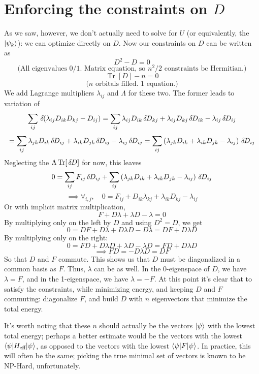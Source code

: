 \documentclass[a4paper,11pt]{article}
\DeclareMathOperator{\Tr}{Tr}
\newcommand{\9}{\,\,\,\,\,\,\,\,\,}
\newcommand{\ichg}{\,\delta\hspace{-0.3mm}}
\begin{document}
\section{Enforcing the constraints on $D$}
As we saw, however, we don't actually need to solve for $U$ (or equivalently, the $\ket{\psi_k}$): we can optimize directly on $D$. Now our constraints on $D$ can be written as
$$D^2 - D = 0$$
$$\textrm{(All eigenvalues 0/1. Matrix equation, so $n^2/2$ constraints bc Hermitian.)}$$
$$\Tr[D]- n = 0$$
$$\textrm{($n$ orbitals filled. 1 equation.)}$$
We add Lagrange multipliers $\lambda_{ij}$ and $\varLambda$ for these two. The former leads to variation of
$$\sum_{ij}\ichg(\lambda_{ij} D_{ik}D_{kj}-D_{ij}) = \sum_{ij}\lambda_{ij}D_{ik}\ichg D_{kj} + \lambda_{ij} D_{kj}\ichg D_{ik} - \lambda_{ij} \ichg D_{ij}$$
$$= \sum_{ij}\lambda_{jk}D_{ik}\ichg D_{ij} + \lambda_{ik} D_{jk}\ichg D_{ij} - \lambda_{ij} \ichg D_{ij} = \sum_{ij}\left(\lambda_{jk}D_{ik} + \lambda_{ik} D_{jk} - \lambda_{ij}\right) \ichg D_{ij}$$
Neglecting the $\Lambda \Tr[\ichg D]$ for now, this leaves
$$0 = \sum_{ij} F_{ij}\ichg D_{ij} + \sum_{ij}\left(\lambda_{jk}D_{ik} + \lambda_{ik} D_{jk} - \lambda_{ij}\right) \ichg D_{ij}$$
$$\implies\forall_{i,j},\quad  0 =  F_{ij} + D_{ik}\lambda_{kj} + \lambda_{ik} D_{kj} - \lambda_{ij}$$
Or with implicit matrix multiplication,
$$F + D\lambda + \lambda D - \lambda = 0$$
By multiplying only on the left by $D$ and using $D^2 = D$, we get
$$0 = DF + D\lambda + D\lambda D - D\lambda = DF + D\lambda D$$
By multiplying only on the right:
$$0 = FD + D\lambda D + \lambda D - \lambda D = FD + D\lambda D$$
$$\implies FD = -D\lambda D = DF$$
So that $D$ and $F$ commute. This shows us that $D$ must be diagonalized in a common basis as $F$. Thus, $\lambda$ can be as well. In the 0-eigenspace of $D$, we have $\lambda = F$, and in the 1-eigenspace, we have $\lambda = -F$. At this point it's clear that to satisfy the constraints, while minimizing energy, and keeping $D$ and $F$ commuting: diagonalize $F$, and build $D$ with $n$ eigenvectors that minimize the total energy.
\par It's worth noting that these $n$ should actually be the vectors $\ket{\psi}$ with the lowest total energy; perhaps a better estimate would be the vectors with the lowest $\braket{\psi|H_{\textrm{eff}}|\psi}$, as opposed to the vectors with the lowest $\braket{\psi|F|\psi}$. In practice, this will often be the same; picking the true minimal set of vectors is known to be NP-Hard, unfortunately.
\end{document}
